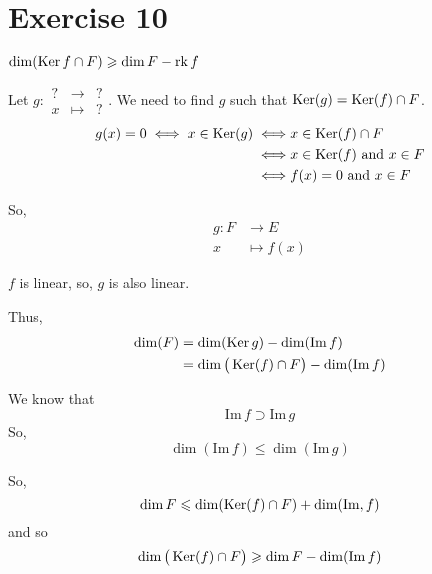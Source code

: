\part{Exercise 10}

$\dim(\operatorname{Ker} f \cap F) \geqslant \dim F - \operatorname{rk} f$

Let $g : \begin{array}{rcl}
	? &\longrightarrow& ? \\
	x &\longmapsto& ?
\end{array}$. We need to find $g$ such that $\operatorname{Ker}(g) = \operatorname{Ker}(f) \cap F$.\\

\begin{align*}
	g(x) = 0 \iff x \in \operatorname{Ker}(g) \iff& x \in \operatorname{Ker}(f) \cap F\\
	\iff&x \in \operatorname{Ker}(f) \text{ and } x \in F\\
	\iff& f(x) = 0 \text{ and } x \in F
\end{align*}

So, \begin{align*}
	g: F &\longrightarrow E \\
	x &\longmapsto f(x)
\end{align*}

$f$ is linear, so, $g$ is also linear.

Thus,
\begin{align*}
	\dim(F) &= \dim(\operatorname{Ker} g) - \dim(\mathrm{Im}\, f) \\
	&= \dim\big(\operatorname{Ker} (f) \cap F\big) - \dim(\mathrm{Im}\, f) \\
\end{align*}

We know that \[
	\mathrm{Im}\, f \supset \mathrm{Im}\, g
\] So, \[
	\dim(\mathrm{Im}\, f) \le \dim(\mathrm{Im}\, g)
\] 

So, \[
	\dim F \leqslant \dim(\operatorname{Ker}(f) \cap F) + \dim(\mathrm{Im}\\,f)
\] and so \[
	\dim\big(\operatorname{Ker} (f) \cap F\big) \geqslant \dim F - \dim(\mathrm{Im}\,f)
\]



